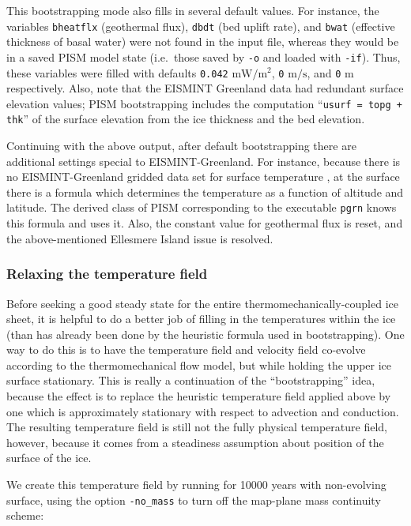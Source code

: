 \documentclass[11pt,final]{amsart}
\begin{document}
This bootstrapping mode also fills in several default values.  For instance, the variables \verb|bheatflx| (geothermal flux), \verb|dbdt| (bed uplift rate), and \verb|bwat| (effective thickness of basal water) were not found in the input file, whereas they would be in a saved PISM model state (i.e.~those saved by \verb|-o| and loaded with \verb|-if|).  Thus, these variables were filled with defaults \verb|0.042| $\text{mW}/\text{m}^2$, \verb|0| $\text{m}/\text{s}$, and \verb|0| m respectively.  Also, note that the EISMINT Greenland data had redundant surface elevation values; PISM bootstrapping includes the computation ``\verb|usurf = topg + thk|'' of the surface elevation from the ice thickness and the bed elevation.

Continuing with the above output, after default bootstrapping there are additional settings special to EISMINT-Greenland.  For instance, because there is no EISMINT-Greenland gridded data set for surface temperature \cite{RitzEISMINT}, at the surface there is a formula which determines the temperature as a function of altitude and latitude.  The derived class of PISM corresponding to the executable \verb|pgrn| knows this formula and uses it.  Also, the constant value for geothermal flux is reset, and the above-mentioned Ellesmere Island issue is resolved.

\subsubsection*{Relaxing the temperature field}  Before seeking a good steady state for the entire thermomechanically-coupled ice sheet, it is helpful to do a better job of filling in the temperatures within the ice (than has already been done by the heuristic formula used in bootstrapping).  One way to do this is to have the temperature field and velocity field co-evolve according to the thermomechanical flow model, but while holding the upper ice surface stationary.  This is really a continuation of the ``bootstrapping'' idea, because the effect is to replace the heuristic temperature field applied above by one which is approximately stationary with respect to advection and conduction.  The resulting temperature field is still not the fully physical temperature field, however, because it comes from a steadiness assumption about position of the surface of the ice.

We create this temperature field by running for 10000 years with non-evolving surface, using the option \verb|-no_mass| to turn off the map-plane mass continuity scheme:
\end{document}

